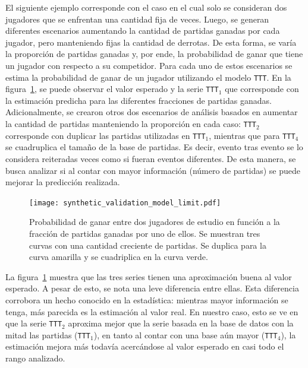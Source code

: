 \documentclass[11pt,twoside,spanish]{report} %
\begin{document}
El siguiente ejemplo corresponde con el caso en el cual solo se consideran dos jugadores que se enfrentan una cantidad fija de veces.
Luego, se generan diferentes escenarios aumentando la cantidad de partidas ganadas por cada jugador, pero manteniendo fijas la cantidad de derrotas.
De esta forma, se var\'ia la proporci\'on de partidas ganadas y, por ende, la probabilidad de ganar que tiene un jugador con respecto a su competidor.
Para cada uno de estos escenarios se estima la probabilidad de ganar de un jugador utilizando el modelo \texttt{TTT}.
En la figura~\ref{fig:limite}, se puede observar el valor esperado y la serie \texttt{TTT}$_1$ que corresponde con la estimaci\'on predicha para las diferentes fracciones de partidas ganadas.
Adicionalmente, se crearon otros dos escenarios de an\'alisis basados en aumentar la cantidad de partidas manteniendo la proporci\'on en cada caso: \texttt{TTT}$_2$ corresponde con duplicar las partidas utilizadas en \texttt{TTT}$_1$, mientras que para \texttt{TTT}$_4$ se cuadruplica el tama\~no de la base de partidas.
Es decir, evento tras evento se lo considera reiteradas veces como si fueran eventos diferentes.
De esta manera, se busca analizar si al contar con mayor informaci\'on (n\'umero de partidas) se puede mejorar la predicci\'on realizada.

 \begin{figure}[H]
	\centering
	\texttt{[image: synthetic\_validation\_model\_limit.pdf]}
	\caption{Probabilidad de ganar entre dos jugadores de estudio en funci\'on a la fracci\'on de partidas ganadas por uno de ellos. 
	Se muestran tres curvas con una cantidad creciente de partidas. Se duplica para la curva amarilla y se cuadriplica en la curva verde.}
	\label{fig:limite}
\end{figure}

La figura~\ref{fig:limite} muestra que las tres series tienen una aproximaci\'on buena al valor esperado.
A pesar de esto, se nota una leve diferencia entre ellas. 
Esta diferencia corrobora un hecho conocido en la estad\'istica: mientras mayor informaci\'on se tenga, m\'as parecida es la estimaci\'on al valor real.
En nuestro caso, esto se ve en que la serie \texttt{TTT}$_2$ aproxima mejor que la serie basada en la base de datos con la mitad las partidas (\texttt{TTT}$_1$), en tanto al contar con una base a\'un mayor (\texttt{TTT}$_4$), la estimaci\'on mejora m\'as todav\'ia acerc\'andose al valor esperado en casi todo el rango analizado.
\end{document}
